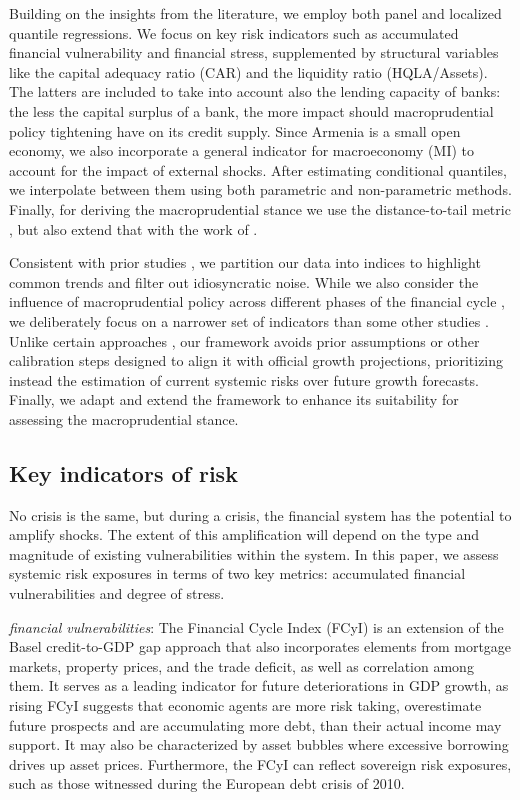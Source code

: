 Building on the insights from the literature, we employ both panel and localized quantile regressions. We focus on key risk indicators such as accumulated financial vulnerability and financial stress, supplemented by structural variables like the capital adequacy ratio (CAR) and the liquidity ratio (HQLA/Assets). The latters are included to take into account also the lending capacity of banks: the less the capital surplus of a bank, the more impact should macroprudential policy tightening have on its credit supply. Since Armenia is a small open economy, we also incorporate a general indicator for macroeconomy (MI) to account for the impact of external shocks. After estimating conditional quantiles, we interpolate between them using both parametric and non-parametric methods. Finally, for deriving the macroprudential stance we use the distance-to-tail metric \citep{esrb2024}, but also extend that with the work of \citet{suarez2022}.

Consistent with prior studies \citep{imf_gar_2019}, we partition our data into indices to highlight common trends and filter out idiosyncratic noise. While we also consider the influence of macroprudential policy across different phases of the financial cycle \citep{galan2020}, we deliberately focus on a narrower set of indicators than some other studies \citep{aikman2019}. Unlike certain approaches \citep{szabo2020}, our framework avoids prior assumptions or other calibration steps designed to align it with official growth projections, prioritizing instead the estimation of current systemic risks over future growth forecasts.  Finally, we adapt and extend the framework to enhance its suitability for assessing the macroprudential stance.

\subsection{Key indicators of risk}
No crisis is the same, but during a crisis, the financial system has the potential to amplify shocks. The extent of this amplification will depend on the type and magnitude of existing vulnerabilities within the system. In this paper, we assess systemic risk exposures in terms of two key metrics: accumulated financial vulnerabilities and degree of stress.

\textit{financial vulnerabilities}: The Financial Cycle Index (FCyI) \citep{hollo2012, plasil2014} is an extension of the Basel credit-to-GDP gap approach \citep{basel2010} that also incorporates elements from mortgage markets, property prices, and the trade deficit, as well as correlation among them. It serves as a leading indicator for future deteriorations in GDP growth, as rising FCyI suggests that economic agents are more risk taking, overestimate future prospects and are accumulating more debt, than their actual income may support. It may also be characterized by asset bubbles where excessive borrowing drives up asset prices. Furthermore, the FCyI can reflect sovereign risk exposures, such as those witnessed during the European debt crisis of 2010.

